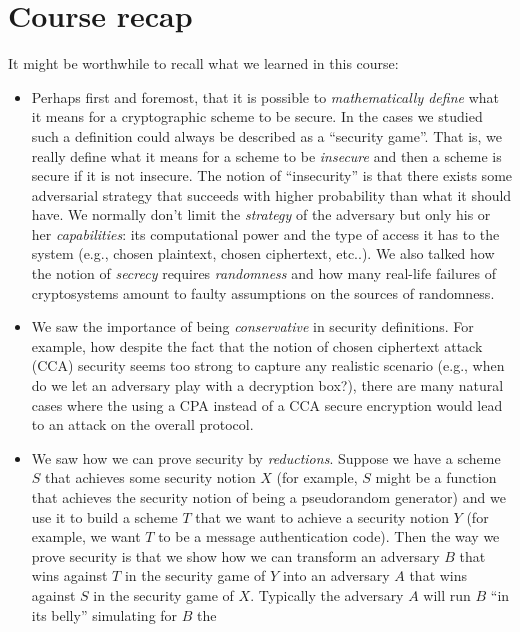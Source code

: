 \chapter{Course recap}\label{Course-recap}

It might be worthwhile to recall what we learned in this course:

\begin{itemize}
\item
  Perhaps first and foremost, that it is possible to
  \emph{mathematically define} what it means for a cryptographic scheme
  to be secure. In the cases we studied such a definition could always
  be described as a ``security game''. That is, we really define what it
  means for a scheme to be \emph{insecure} and then a scheme is secure
  if it is not insecure. The notion of ``insecurity'' is that there
  exists some adversarial strategy that succeeds with higher probability
  than what it should have. We normally don't limit the \emph{strategy}
  of the adversary but only his or her \emph{capabilities}: its
  computational power and the type of access it has to the system (e.g.,
  chosen plaintext, chosen ciphertext, etc..). We also talked how the
  notion of \emph{secrecy} requires \emph{randomness} and how many
  real-life failures of cryptosystems amount to faulty assumptions on
  the sources of randomness.
\item
  We saw the importance of being \emph{conservative} in security
  definitions. For example, how despite the fact that the notion of
  chosen ciphertext attack (CCA) security seems too strong to capture
  any realistic scenario (e.g., when do we let an adversary play with a
  decryption box?), there are many natural cases where the using a CPA
  instead of a CCA secure encryption would lead to an attack on the
  overall protocol.
\item
  We saw how we can prove security by \emph{reductions}. Suppose we have
  a scheme \(S\) that achieves some security notion \(X\) (for example,
  \(S\) might be a function that achieves the security notion of being a
  pseudorandom generator) and we use it to build a scheme \(T\) that we
  want to achieve a security notion \(Y\) (for example, we want \(T\) to
  be a message authentication code). Then the way we prove security is
  that we show how we can transform an adversary \(B\) that wins against
  \(T\) in the security game of \(Y\) into an adversary \(A\) that wins
  against \(S\) in the security game of \(X\). Typically the adversary
  \(A\) will run \(B\) ``in its belly'' simulating for \(B\) the

\end{itemize}
